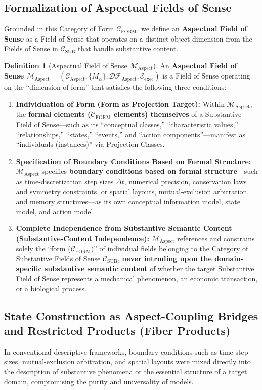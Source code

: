 \documentclass[11pt,a4paper]{article}
\theoremstyle{definition}
\newtheorem{definition}{Definition}[section]
\theoremstyle{plain}
\theoremstyle{remark}
\newcommand{\CFORM}{\mathcal{C}_{\mathrm{FORM}}}
\newcommand{\CSUB}{\mathcal{C}_{\mathrm{SUB}}}
\newcommand{\CAspect}{\mathcal{C}_{\mathrm{Aspect}}}
\newcommand{\MAspect}{\mathcal{M}_{\mathrm{Aspect}}}
\newcommand{\Eexec}{\mathcal{E}_{\mathrm{exec}}}
\begin{document}
\subsection{Formalization of Aspectual Fields of Sense}
Grounded in this Category of Form $\CFORM$, we define an \textbf{Aspectual Field of Sense} as a Field of Sense that operates on a distinct object dimension from the Fields of Sense in $\CSUB$ that handle substantive content.

\begin{definition}[Aspectual Field of Sense $\MAspect$]\label{def:aspectual-field}
An \textbf{Aspectual Field of Sense $\MAspect = (\CAspect, \{M_{\alpha}\}, \mathcal{DF}_{\mathrm{Aspect}}, \Eexec)$} is a Field of Sense operating on the ``dimension of form'' that satisfies the following three conditions:

\begin{enumerate}
    \item \textbf{Individuation of Form (Form as Projection Target):} Within $\MAspect$, the \textbf{formal elements ($\CFORM$ elements) themselves} of a Substantive Field of Sense---such as its ``conceptual classes,'' ``characteristic values,'' ``relationships,'' ``states,'' ``events,'' and ``action components''---manifest as ``individuals (instances)'' via Projection Classes.
    \item \textbf{Specification of Boundary Conditions Based on Formal Structure:} $\MAspect$ specifies \textbf{boundary conditions based on formal structure}---such as time-discretization step sizes $\Delta t$, numerical precision, conservation laws and symmetry constraints, or spatial layouts, mutual-exclusion arbitration, and memory structures---as its own conceptual information model, state model, and action model.
    \item \textbf{Complete Independence from Substantive Semantic Content (Substantive-Content Independence):} $\MAspect$ references and constrains solely the ``form ($\CFORM$)'' of individual fields belonging to the Category of Substantive Fields of Sense $\CSUB$, \textbf{never intruding upon the domain-specific substantive semantic content} of whether the target Substantive Field of Sense represents a mechanical phenomenon, an economic transaction, or a biological process.
\end{enumerate}
\end{definition}

\subsection{State Construction as Aspect-Coupling Bridges and Restricted Products (Fiber Products)}
In conventional descriptive frameworks, boundary conditions such as time step sizes, mutual-exclusion arbitration, and spatial layouts were mixed directly into the description of substantive phenomena or the essential structure of a target domain, compromising the purity and universality of models.
\end{document}
